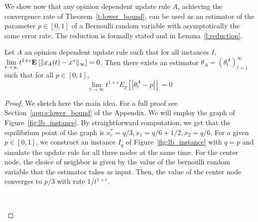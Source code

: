 We show now that any opinion dependent update rule $A$, achieving the
convergence rate of Theorem~\ref{t:lower_bound}, can be used as an
estimator of the parameter $p \in [0,1]$ of a Bernoulli random variable with
asymptotically the same error rate.
The reduction is formally stated and in Lemma~\ref{l:reduction}.
\begin{lemma}\label{l:reduction}
  Let $A$ an opinion dependent update rule such that for all instances $I$,
  $\lim \limits_{t \rightarrow \infty} t^{1+c}
  \bm{\mathrm{E}}_{} \left[ \| x_A(t)-x^* \|_{\infty} \right]=0$.
  Then there exists an estimator $\theta_A=(\theta_t^A)_{t=1}^\infty$ such that for all
  $p \in [0,1]$,
  \[\lim_{t \rightarrow \infty}t^{1+c}E_p[|\theta_t^A-p|]=0\]
\end{lemma}
\begin{proof}
  We sketch here the main idea. For a full proof see Section~\ref{app:s:lower_bound}
  of the Appendix. We will employ the graph of Figure~\ref{fig:lb_instance}.
  By straightforward computation, we get that the equilibrium point of
  the graph is $x_c^* = q/3, x_1 = q/6+1/2, x_2 = q/6$. 
  For a given $p \in [0,1]$, we construct an instance $I_q$ of 
  Figure~\ref{fig:lb_instance} with $q = p$
  and simulate the update rule for all three nodes at the same time.
  For the center node, the choice of neighbor is given by the value
  of the bernoulli random variable that the estimator takes
  as input. Then, the value of the center node converges to $p/3$ with
  rate $1/t^{1+c}$. 
  \begin{figure}\
    \centering

\end{figure}
\end{proof}

